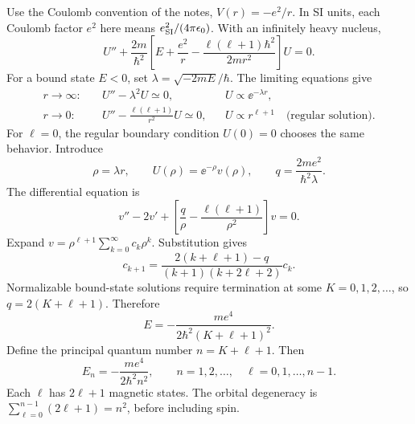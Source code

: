 Use the Coulomb convention of the notes,
$V(r)=-e^2/r$. In SI units, each Coulomb factor $e^2$ here means
$e_{\rm SI}^2/(4\pi\epsilon_0)$. With an infinitely heavy nucleus,
\[
 U''+\frac{2m}{\hbar^2}
 \left[E+\frac{e^2}{r}-\frac{\ell(\ell+1)\hbar^2}{2mr^2}\right]U=0.
\]
For a bound state $E<0$, set
$\lambda=\sqrt{-2mE}/\hbar$. The limiting equations give
\begin{align*}
 r\to\infty:&\quad U''-\lambda^2U\simeq0,
       &&U\propto\ee^{-\lambda r},\\
 r\to0:&\quad U''-\frac{\ell(\ell+1)}{r^2}U\simeq0,
       &&U\propto r^{\ell+1}
       \quad\text{(regular solution)}.
\end{align*}
For $\ell=0$, the regular boundary condition $U(0)=0$ chooses the
same behavior. Introduce
\[
 \rho=\lambda r,\qquad U(\rho)=\ee^{-\rho}v(\rho),\qquad
 q=\frac{2me^2}{\hbar^2\lambda}.
\]
The differential equation is
\[
 v''-2v'+\left[\frac q\rho-\frac{\ell(\ell+1)}{\rho^2}\right]v=0.
\]
Expand $v=\rho^{\ell+1}\sum_{k=0}^{\infty}c_k\rho^k$. Substitution gives
\[
 c_{k+1}=\frac{2(k+\ell+1)-q}{(k+1)(k+2\ell+2)}c_k.
\]
Normalizable bound-state solutions require termination at some
$K=0,1,2,\ldots$, so $q=2(K+\ell+1)$. Therefore
\[
 E=-\frac{me^4}{2\hbar^2(K+\ell+1)^2}.
\]
Define the principal quantum number $n=K+\ell+1$. Then
\[
 \boxed{E_n=-\frac{me^4}{2\hbar^2n^2}},\qquad
 n=1,2,\ldots,\quad \ell=0,1,\ldots,n-1.
\]
Each $\ell$ has $2\ell+1$ magnetic states. The orbital degeneracy is
$\sum_{\ell=0}^{n-1}(2\ell+1)=n^2$, before including spin.
